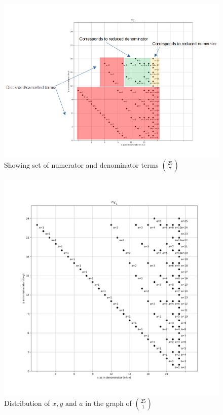 \documentclass[10pt, twoside]{article}
\newcommand*{\Combination}[2]{\binom{#1}{#2}}%
\begin{document}
\begin{figure}[ph!]
	\includegraphics[width=\linewidth]{CalculationOfCombination.png}
	\caption{Showing set of numerator and denominator terms $\Combination{25}{7}$}
	\label{CalculationOfCombination}
\end{figure}
\begin{figure}[ph!]
	\includegraphics[width=\linewidth]{25_1_alone.png}
	\caption{Distribution of $x,y \text{ and } a$ in the graph of $\Combination{25}{1}$}
	\label{25_C_1_example}
\end{figure}
\end{document}
